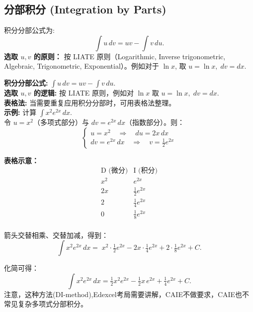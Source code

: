 \documentclass[8pt,a4paper,twoside]{tau-class/tau}
\begin{document}
\subsection{分部积分 (Integration by Parts)}
积分分部公式为:
\[
\int u\,dv = uv − \int v\,du.
\]
\textbf{选取 \(u,v\) 的原则：} 按 LIATE 原则（Logarithmic, Inverse trigonometric, Algebraic, Trigonometric, Exponential）。例如对于 \(\ln x\), 取 \(u=\ln x,\; dv=dx\).
\newpage
\begin{tcolorbox}[enhanced, breakable, boxsep=1pt, colframe=blue!50!black, colback=white,
  fonttitle=\footnotesize, fontupper=\footnotesize, title style={align=center},
  title=积分分部及表格法 (Integration by Parts)]
\noindent
\textbf{积分分部公式:} \(\displaystyle \int u\,dv = uv − \int v\,du.\)\\[4pt]
\textbf{选取 \(u,v\) 的逻辑:} 按 LIATE 原则，例如对 \(\ln x\) 取 \(u=\ln x,\; dv=dx\).\\[4pt]
\textbf{表格法:} 当需要重复应用积分分部时，可用表格法整理。\\[4pt]

\textbf{示例:} 计算 \(\displaystyle \int x^2 e^{2x}\,dx\).\\[4pt]
令 \(u = x^2\)（多项式部分）与 \(dv = e^{2x}\,dx\)（指数部分）。则：
\[
\begin{cases}
  u = x^2 \quad\Rightarrow\quad du = 2x\,dx \\
  dv = e^{2x}\,dx \quad\Rightarrow\quad v = \frac{1}{2} e^{2x}
\end{cases}
\]

\noindent
\textbf{表格示意：}  
\[
\begin{array}{c|c}
  \text{D (微分)} & \text{I (积分)} \\
  \hline
  x^2 & e^{2x} \\
  2x & \tfrac{1}{2}e^{2x} \\
  2 & \tfrac{1}{4}e^{2x} \\
  0 & \tfrac{1}{8}e^{2x} \\
\end{array}
\]

\noindent
箭头交替相乘、交替加减，得到：
\[
\int x^2 e^{2x}\,dx
= \; x^2 \cdot \tfrac{1}{2} e^{2x}
− 2x \cdot \tfrac{1}{4} e^{2x}
+ 2 \cdot \tfrac{1}{8} e^{2x}
+ C.
\]

\noindent
化简可得：
\[
\int x^2 e^{2x}\,dx
= \tfrac{1}{2} x^2 e^{2x}
− \tfrac{1}{2} x\,e^{2x}
+ \tfrac{1}{4} e^{2x}
+ C.
\]
注意，这种方法(DI-method),Edexcel考局需要讲解，CAIE不做要求，CAIE也不常见复杂多项式分部积分。

\end{tcolorbox}
\end{document}
